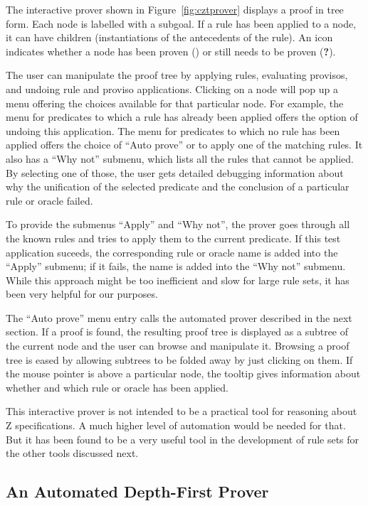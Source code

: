 \documentclass{entcs}
\begin{document}
The interactive prover shown in Figure~\ref{fig:cztprover} displays a
proof in tree form.  Each node is labelled with a subgoal.  If a rule
has been applied to a node, it can have children (instantiations of
the antecedents of the rule).  An icon indicates whether a node has
been proven () or still needs to be proven ({\bf ?}).

The user can manipulate the proof tree by applying rules, evaluating
provisos, and undoing rule and proviso applications.  Clicking on a
node will pop up a menu offering the choices available for that
particular node.  For example, the menu for predicates to which a rule
has already been applied offers the option of undoing this
application.  The menu for predicates to which no rule has been
applied offers the choice of ``Auto prove'' or to apply one of the
matching rules.  It also has a ``Why not'' submenu, which lists all
the rules that cannot be applied.  By selecting one of those, the user
gets detailed debugging information about why the unification of the
selected predicate and the conclusion of a particular rule or oracle
failed.

To provide the submenus ``Apply'' and ``Why not'', the prover goes
through all the known rules and tries to apply them to the current
predicate.  If this test application suceeds, the corresponding rule
or oracle name is added into the ``Apply'' submenu; if it fails, the
name is added into the ``Why not'' submenu.  While this approach might
be too inefficient and slow for large rule sets, it has been very
helpful for our purposes.

The ``Auto prove'' menu entry calls the automated prover described in
the next section.  If a proof is found, the resulting proof tree is
displayed as a subtree of the current node and the user can browse and
manipulate it.  Browsing a proof tree is eased by allowing subtrees to
be folded away by just clicking on them.  If the mouse pointer is
above a particular node, the tooltip gives information about whether
and which rule or oracle has been applied.

This interactive prover is not intended to be a practical tool for
reasoning about Z specifications.  A much higher level of automation
would be needed for that.  But it has been found to be a very useful
tool in the development of rule sets for the other tools discussed
next.

\subsection{An Automated Depth-First Prover}
\end{document}
